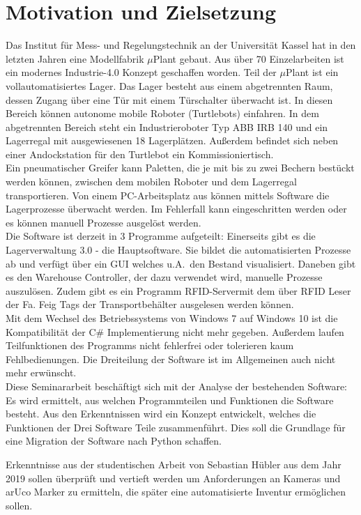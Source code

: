 
\chapter{Motivation und Zielsetzung}

    Das Institut für Mess- und Regelungstechnik an der Universität Kassel hat in den letzten Jahren eine Modellfabrik $\mu$Plant gebaut.
    Aus über 70 Einzelarbeiten ist ein modernes Industrie-4.0 Konzept geschaffen worden.
    Teil der $\mu$Plant ist ein vollautomatisiertes Lager.
    Das Lager besteht aus einem abgetrennten Raum, dessen Zugang über eine Tür mit einem Türschalter überwacht ist.
    In diesen Bereich können autonome mobile Roboter (Turtlebots) einfahren.
    In dem abgetrennten Bereich steht ein Industrieroboter Typ ABB IRB 140 und ein Lagerregal mit ausgewiesenen 18 Lagerplätzen.
    Außerdem befindet sich neben einer Andockstation für den Turtlebot ein Kommissioniertisch. \\

    Ein pneumatischer Greifer kann Paletten, die je mit bis zu zwei Bechern bestückt werden können,
    zwischen dem mobilen Roboter und dem Lagerregal transportieren.
    Von einem PC-Arbeitsplatz aus können mittels Software die Lagerprozesse überwacht werden.
    Im Fehlerfall kann eingeschritten werden oder es können manuell Prozesse ausgelöst werden.\\

    Die Software ist derzeit in 3 Programme aufgeteilt: Einerseits gibt es die Lagerverwaltung 3.0 - die Hauptsoftware.
    Sie bildet die automatisierten Prozesse ab und verfügt über ein GUI welches u.A.\ den Bestand visualisiert.
    Daneben gibt es den Warehouse Controller, der dazu verwendet wird, manuelle Prozesse auszulösen.
    Zudem gibt es ein Programm \glqq RFID-Server\grqq mit dem über RFID Leser der Fa. Feig Tags der Transportbehälter
    ausgelesen werden können.
    \\
    Mit dem Wechsel des Betriebssystems von Windows 7 auf Windows 10 ist die Kompatibilität der C\# Implementierung
    nicht mehr gegeben.
    Außerdem laufen Teilfunktionen des Programms nicht fehlerfrei oder tolerieren kaum Fehlbedienungen.
    Die Dreiteilung der Software ist im Allgemeinen auch nicht mehr erwünscht. \\

    Diese Seminararbeit beschäftigt sich mit der Analyse der bestehenden Software:
    Es wird ermittelt, aus welchen Programmteilen und Funktionen die Software besteht.
    Aus den Erkenntnissen wird ein Konzept entwickelt, welches die Funktionen der Drei Software Teile zusammenführt.
    Dies soll die Grundlage für eine Migration der Software nach Python schaffen.

    Erkenntnisse aus der studentischen Arbeit von Sebastian Hübler aus dem Jahr 2019 \cite{Hübler2019} sollen überprüft
    und vertieft werden um Anforderungen an Kameras und arUco Marker zu ermitteln, die später eine automatisierte
    Inventur ermöglichen sollen.

